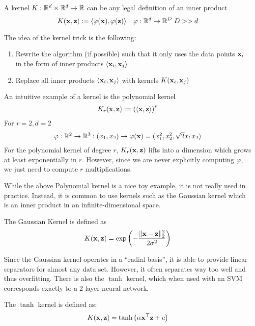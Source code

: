 \begin{defn}
    A kernel $K: \mathbb{R}^d \times \mathbb{R}^d \to \mathbb{R}$ can be any legal definition of an inner product
    \begin{align*}
        K(\mathbf{x}, \mathbf{z}) := \langle \varphi(\mathbf{x}), \varphi(\mathbf{z}) \rangle \quad \varphi: \mathbb{R}^d \to \mathbb{R}^D \; D >> d
    \end{align*}
\end{defn}

\begin{defn}
    The idea of the kernel trick is the following:
    \begin{enumerate}
        \item Rewrite the algorithm (if possible) such that it only uses the data points $\mathbf{x}_i$ in the form of inner
        products $\langle \mathbf{x}_i, \mathbf{x}_j \rangle$
        \item Replace all inner products $\langle \mathbf{x}_i, \mathbf{x}_j \rangle$ with kernels $K(\mathbf{x}_i, \mathbf{x}_j)$
    \end{enumerate}
\end{defn}

\begin{example}
    An intuitive example of a kernel is the polynomial kernel
    \begin{align*}
        K_r(\mathbf{x}, \mathbf{z}) := \left( \langle \mathbf{x}, \mathbf{z} \rangle \right)^r
    \end{align*}
    For $r = 2, d=2$
    \begin{align*}
        \varphi: \mathbb{R}^2 \to \mathbb{R}^3 : (x_1, x_2) \to \varphi(\mathbf{x}) = (x_1^2, x_2^2, \sqrt{2}x_1x_2)
    \end{align*}
    For the polynomial kernel of degree $r$, $K_r(\mathbf{x}, \mathbf{z})$ lifts into a dimension which
    grows at least exponentially in $r$. However, since we are never explicitly computing $\varphi$,
    we just need to compute $r$ multiplications.
\end{example}
While the above Polynomial kernel is a nice toy example, it is not really used in practice. Instead, it is common
to use kernels such as the {\rm Gaussian} kernel which is an inner product in an infinite-dimensional space.
\begin{defn}
    The Gaussian Kernel is defined as
    \begin{align*}
        K(\mathbf{x}, \mathbf{z}) = \exp \left( -\frac{\lVert \mathbf{x} - \mathbf{z} \rVert_2^2}{2\sigma^2} \right)
    \end{align*}
\end{defn}
Since the Gaussian kernel operates in a ``radial basis'', it is able to provide linear separators for almost any data set.
However, it often separates way too well and thus overfitting.
There is also the $\tanh$ kernel, which when used with an SVM corresponds exactly to a $2$-layer neural-network.
\begin{defn}
    The $\tanh$ kernel is defined as:
    $$K(\mathbf{x}, \mathbf{z}) = \tanh\left( \alpha \mathbf{x}^\top \mathbf{z} + c \right)$$
\end{defn}

